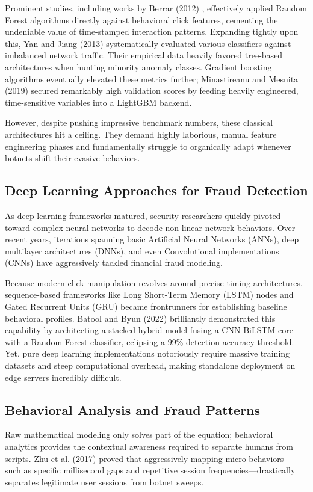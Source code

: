 \documentclass[conference]{IEEEtran}
\begin{document}
Prominent studies, including works by Berrar (2012) \cite{b6}, effectively applied Random Forest algorithms directly against behavioral click features, cementing the undeniable value of time-stamped interaction patterns. Expanding tightly upon this, Yan and Jiang (2013) \cite{b7} systematically evaluated various classifiers against imbalanced network traffic. Their empirical data heavily favored tree-based architectures when hunting minority anomaly classes. Gradient boosting algorithms eventually elevated these metrics further; Minastireanu and Mesnita (2019) \cite{b10} secured remarkably high validation scores by feeding heavily engineered, time-sensitive variables into a LightGBM backend. 

However, despite pushing impressive benchmark numbers, these classical architectures hit a ceiling. They demand highly laborious, manual feature engineering phases and fundamentally struggle to organically adapt whenever botnets shift their evasive behaviors.

\subsection{Deep Learning Approaches for Fraud Detection}
As deep learning frameworks matured, security researchers quickly pivoted toward complex neural networks to decode non-linear network behaviors. Over recent years, iterations spanning basic Artificial Neural Networks (ANNs), deep multilayer architectures (DNNs), and even Convolutional implementations (CNNs) have aggressively tackled financial fraud modeling. 

Because modern click manipulation revolves around precise timing architectures, sequence-based frameworks like Long Short-Term Memory (LSTM) nodes and Gated Recurrent Units (GRU) became frontrunners for establishing baseline behavioral profiles. Batool and Byun (2022) \cite{b11} brilliantly demonstrated this capability by architecting a stacked hybrid model fusing a CNN-BiLSTM core with a Random Forest classifier, eclipsing a 99\% detection accuracy threshold. Yet, pure deep learning implementations notoriously require massive training datasets and steep computational overhead, making standalone deployment on edge servers incredibly difficult.

\subsection{Behavioral Analysis and Fraud Patterns}
Raw mathematical modeling only solves part of the equation; behavioral analytics provides the contextual awareness required to separate humans from scripts. Zhu et al. (2017) \cite{b2} proved that aggressively mapping micro-behaviors---such as specific millisecond gaps and repetitive session frequencies---drastically separates legitimate user sessions from botnet sweeps.
\end{document}
